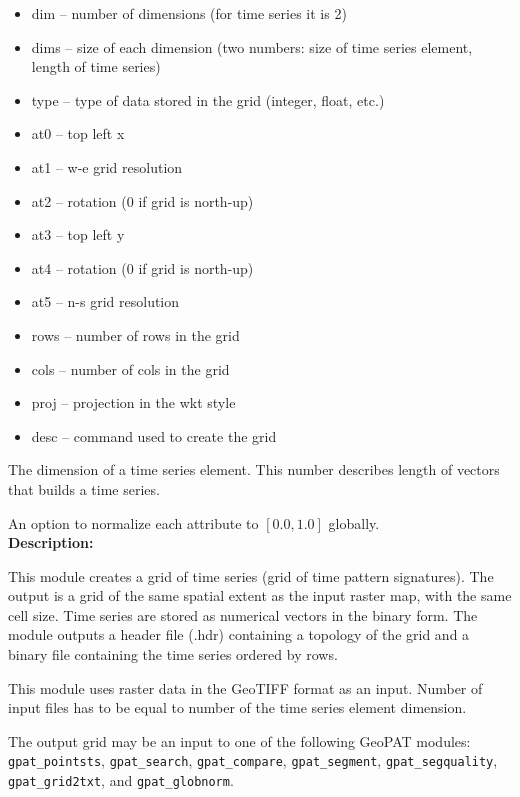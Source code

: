 \begin{itemize}
	\item dim -- number of dimensions (for time series it is 2)
	\item dims -- size of each dimension (two numbers: size of time series element, length of time series)
	\item type -- type of data stored in the grid (integer, float, etc.)
	\item at0 -- top left x
	\item at1 -- w-e grid resolution
	\item at2 -- rotation (0 if grid is north-up)
	\item at3 -- top left y
	\item at4 -- rotation (0 if grid is north-up)
	\item at5 -- n-s grid resolution
	\item rows -- number of rows in the grid
	\item cols -- number of cols in the grid
	\item proj -- projection in the wkt style
	\item desc -- command used to create the grid
\end{itemize}


The dimension of a time series element. 
This number describes length of vectors that builds a time series.


An option to normalize each attribute to $[0.0, 1.0]$ globally.\\

{\bf Description:}

This module creates a grid of time series (grid of time pattern signatures).
The output is a grid of the same spatial extent as the input raster map, with the same cell size.
Time series are stored as numerical vectors in the binary form.
The module outputs a header file (.hdr) containing a topology of the grid and a binary file containing the time series ordered by rows.

This module uses raster data in the GeoTIFF format as an input. 
Number of input files has to be equal to number of the time series element dimension.

The output grid may be an input to one of the following GeoPAT modules: {\tt gpat\_pointsts}, {\tt gpat\_search}, {\tt gpat\_compare}, {\tt gpat\_segment}, {\tt gpat\_segquality}, {\tt gpat\_grid2txt}, and {\tt gpat\_globnorm}.

